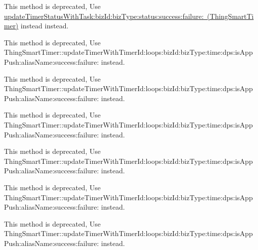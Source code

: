 \begin{DoxyRefList}
\label{deprecated__deprecated000098}%
%
This method is deprecated, Use \mbox{\hyperlink{interface_thing_smart_timer_ac6661dc6ea288e68f98cc253ac9eca02}{update\+Timer\+Status\+With\+Task\+:biz\+Id\+:biz\+Type\+:status\+:success\+:failure\+: (\+Thing\+Smart\+Timer)}} instead instead.  
\item[(Thing\+Deprecated\+Api) Member \mbox{\hyperlink{category_thing_smart_timer_07_thing_deprecated_api_08_a62121ab4c358783546bb592df534c983}{\mbox{[}Thing\+Smart\+Timer(Thing\+Deprecated\+Api) update\+Timer\+With\+Task\+:loops\+:dev\+Id\+:timer\+Id\+:time\+:dps\+:time\+Zone\+:is\+App\+Push\+:alias\+Name\+:success\+:failure\+:\mbox{]}}} ]\label{deprecated__deprecated000129}%
%
This method is deprecated, Use Thing\+Smart\+Timer\+::update\+Timer\+With\+Timer\+Id\+:loops\+:biz\+Id\+:biz\+Type\+:time\+:dps\+:is\+App\+Push\+:alias\+Name\+:success\+:failure\+: instead. 

\label{deprecated__deprecated000111}%
%
This method is deprecated, Use Thing\+Smart\+Timer\+::update\+Timer\+With\+Timer\+Id\+:loops\+:biz\+Id\+:biz\+Type\+:time\+:dps\+:is\+App\+Push\+:alias\+Name\+:success\+:failure\+: instead. 

\label{deprecated__deprecated000102}%
%
This method is deprecated, Use Thing\+Smart\+Timer\+::update\+Timer\+With\+Timer\+Id\+:loops\+:biz\+Id\+:biz\+Type\+:time\+:dps\+:is\+App\+Push\+:alias\+Name\+:success\+:failure\+: instead. 

\label{deprecated__deprecated000120}%
%
This method is deprecated, Use Thing\+Smart\+Timer\+::update\+Timer\+With\+Timer\+Id\+:loops\+:biz\+Id\+:biz\+Type\+:time\+:dps\+:is\+App\+Push\+:alias\+Name\+:success\+:failure\+: instead.  
\item[(Thing\+Deprecated\+Api) Member \mbox{\hyperlink{category_thing_smart_timer_07_thing_deprecated_api_08_afa63e7ee6f0f0a9afa3d65dccc764de8}{\mbox{[}Thing\+Smart\+Timer(Thing\+Deprecated\+Api) update\+Timer\+With\+Task\+:loops\+:dev\+Id\+:timer\+Id\+:time\+:dps\+:time\+Zone\+:success\+:failure\+:\mbox{]}}} ]\label{deprecated__deprecated000119}%
%
This method is deprecated, Use Thing\+Smart\+Timer\+::update\+Timer\+With\+Timer\+Id\+:loops\+:biz\+Id\+:biz\+Type\+:time\+:dps\+:is\+App\+Push\+:alias\+Name\+:success\+:failure\+: instead. 

\label{deprecated__deprecated000101}%
%
This method is deprecated, Use Thing\+Smart\+Timer\+::update\+Timer\+With\+Timer\+Id\+:loops\+:biz\+Id\+:biz\+Type\+:time\+:dps\+:is\+App\+Push\+:alias\+Name\+:success\+:failure\+: instead. 


\end{DoxyRefList}
